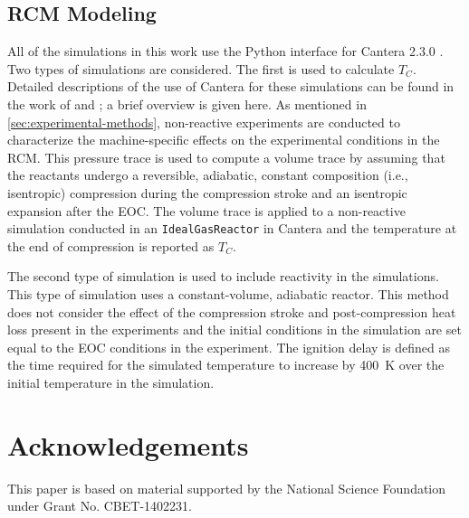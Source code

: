 \documentclass[12pt]{../ussci}
\begin{document}
\subsection{RCM Modeling}\label{sec:rcm-modeling}

All of the simulations in this work use the Python interface for Cantera 2.3.0
\autocite{cantera}. Two types of simulations are considered. The first is used
to calculate \(T_C\). Detailed descriptions of the use of Cantera for these
simulations can be found in the work of \textcite{Weber2016a} and
\textcite{Dames2016}; a brief overview is given here. As mentioned in
\cref{sec:experimental-methods}, non-reactive experiments are conducted to
characterize the machine-specific effects on the experimental conditions in the
RCM. This pressure trace is used to compute a volume trace by assuming that the
reactants undergo a reversible, adiabatic, constant composition (i.e.,
isentropic) compression during the compression stroke and an isentropic
expansion after the EOC. The volume trace is applied to a non-reactive
simulation conducted in an \verb|IdealGasReactor| in Cantera \autocite{cantera}
and the temperature at the end of compression is reported as \(T_C\).

The second type of simulation is used to include reactivity in the simulations.
This type of simulation uses a constant-volume, adiabatic reactor. This method
does not consider the effect of the compression stroke and post-compression heat
loss present in the experiments and the initial conditions in the simulation are
set equal to the EOC conditions in the experiment. The ignition delay is defined
as the time required for the simulated temperature to increase by \SI{400}{\K}
over the initial temperature in the simulation.

\section{Acknowledgements}\label{acknowledgements}

This paper is based on material supported by the National Science
Foundation under Grant No. CBET-1402231.

\printbibliography
\end{document}
